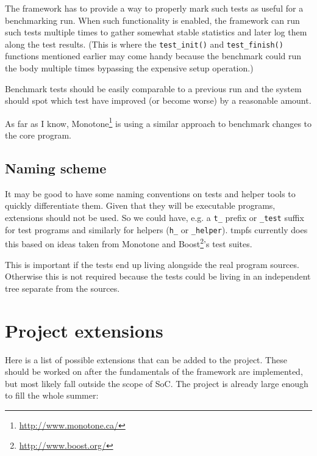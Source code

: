 \documentclass[a4paper,10pt]{article}
\begin{document}
The framework has to provide a way to properly mark such tests as useful
for a benchmarking run.  When such functionality is enabled, the framework
can run such tests multiple times to gather somewhat stable statistics
and later log them along the test results.  (This is where the
\verb*|test_init()| and \verb*|test_finish()| functions mentioned earlier
may come handy because the benchmark could run the body multiple times
bypassing the expensive setup operation.)

Benchmark tests should be easily comparable to a previous run and the
system should spot which test have improved (or become worse) by a
reasonable amount.

As far as I know, Monotone\footnote{\url{http://www.monotone.ca/}} is using
a similar approach to benchmark changes to the core program.


\subsection{Naming scheme}

It may be good to have some naming conventions on tests and helper tools
to quickly differentiate them.  Given that they will be executable
programs, extensions should not be used.  So we could have, e.g. a
\verb*|t_| prefix or \verb*|_test| suffix for test programs and similarly
for helpers (\verb*|h_| or \verb*|_helper|).  tmpfs currently does this
based on ideas taken from Monotone and
Boost\footnote{\url{http://www.boost.org/}}'s test suites.

This is important if the tests end up living alongside the real program
sources.  Otherwise this is not required because the tests could be living
in an independent tree separate from the sources.


\section{Project extensions}

Here is a list of possible extensions that can be added to the project.
These should be worked on after the fundamentals of the framework are
implemented, but most likely fall outside the scope of SoC.  The project is
already large enough to fill the whole summer:
\end{document}
